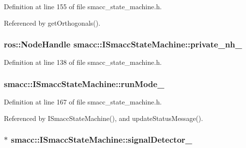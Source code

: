 Definition at line 155 of file smacc\+\_\+state\+\_\+machine.\+h.



Referenced by get\+Orthogonals().

\subsubsection[{\texorpdfstring{private\+\_\+nh\+\_\+}{private_nh_}}]{\setlength{\rightskip}{0pt plus 5cm}ros\+::\+Node\+Handle smacc\+::\+I\+Smacc\+State\+Machine\+::private\+\_\+nh\+\_\+\hspace{0.3cm}{\ttfamily [protected]}}\hypertarget{classsmacc_1_1ISmaccStateMachine_a9c6a5c647ecca6599589c12fdcd53bfc}{}\label{classsmacc_1_1ISmaccStateMachine_a9c6a5c647ecca6599589c12fdcd53bfc}


Definition at line 138 of file smacc\+\_\+state\+\_\+machine.\+h.

\subsubsection[{\texorpdfstring{run\+Mode\+\_\+}{runMode_}}]{ smacc\+::\+I\+Smacc\+State\+Machine\+::run\+Mode\+\_\+\hspace{0.3cm}{\ttfamily [private]}}\hypertarget{classsmacc_1_1ISmaccStateMachine_a9f8cfbf577f7ae7a48b7a328e2e6b589}{}\label{classsmacc_1_1ISmaccStateMachine_a9f8cfbf577f7ae7a48b7a328e2e6b589}


Definition at line 167 of file smacc\+\_\+state\+\_\+machine.\+h.



Referenced by I\+Smacc\+State\+Machine(), and update\+Status\+Message().

\subsubsection[{\texorpdfstring{signal\+Detector\+\_\+}{signalDetector_}}]{$\ast$ smacc\+::\+I\+Smacc\+State\+Machine\+::signal\+Detector\+\_\+\hspace{0.3cm}{\ttfamily [private]}}\hypertarget{classsmacc_1_1ISmaccStateMachine_a3982eb671f5f001cb047d3a467789986}{}\label{classsmacc_1_1ISmaccStateMachine_a3982eb671f5f001cb047d3a467789986}


